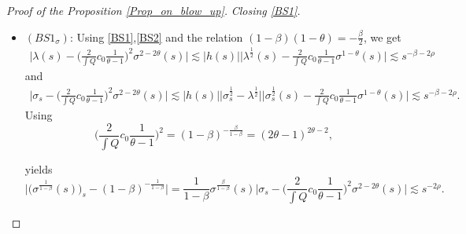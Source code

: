 \documentclass[16pt,english, oneside,reqno]{smfart}
\begin{document}
\begin{proof}[Proof of the Proposition \ref{Prop_on_blow_up}]
\vspace{0.2cm}
\textit{Closing \eqref{BS1}.} 
\begin{itemize}
    \item $(BS1_{\sigma})$: Using \eqref{BS1},\eqref{BS2} and the relation $(1-\beta)(1-\theta) = -\frac{\beta}{2}$, we get
\begin{equation}\label{lambda_sigma_2_2theta}
    \begin{split}
        \Big\lvert \lambda(s) - \Big( \frac{2}{\int Q}c_0 \frac{1}{\theta -1} \Big)^2 \sigma^{2-2\theta}(s) \Big\rvert \lesssim |h(s)| \Big\lvert \lambda^{\frac{1}{2}}(s) - \frac{2}{\int Q} c_0 \frac{1}{\theta -1} \sigma^{1-\theta}(s)\Big\rvert 
        \lesssim s^{-\beta-2\rho}
    \end{split}
\end{equation}
    and 
\begin{equation}
    \begin{split}
        \Big\lvert \sigma_s - \Big( \frac{2}{\int Q}c_0 \frac{1}{\theta -1} \Big)^2 \sigma^{2-2\theta}(s) \Big\rvert \lesssim |h(s)| \Big| \sigma_s^{\frac{1}{2}} - \lambda^{\frac{1}{2}} \Big| \Big\lvert \sigma_s^{\frac{1}{2}}(s) - \frac{2}{\int Q} c_0 \frac{1}{\theta -1} \sigma^{1-\theta}(s)\Big\rvert 
        \lesssim s^{-\beta-2\rho}.
\end{split}
\end{equation}
Using 
\begin{equation}\label{relation_on_constant_2theta_minus_one}
    \Big( \frac{2}{\int Q} c_0 \frac{1}{\theta -1}\Big)^2 = (1-\beta )^{-\frac{\beta}{1-\beta}} = (2\theta -1)^{2\theta - 2},
\end{equation}

yields
\begin{equation}
    \Big\lvert \big(\sigma^{\frac{1}{1-\beta}}(s)\big)_s - (1-\beta)^{-\frac{1}{1-\beta}} \Big\rvert = \frac{1}{1-\beta} \sigma^{\frac{\beta}{1-\beta}}(s) \Big\lvert \sigma_s - \Big( \frac{2}{\int Q}c_0 \frac{1}{\theta -1} \Big)^2 \sigma^{2-2\theta}(s) \Big\rvert \lesssim s^{-2 \rho}.
\end{equation}



\end{itemize}
\end{proof}
\end{document}
